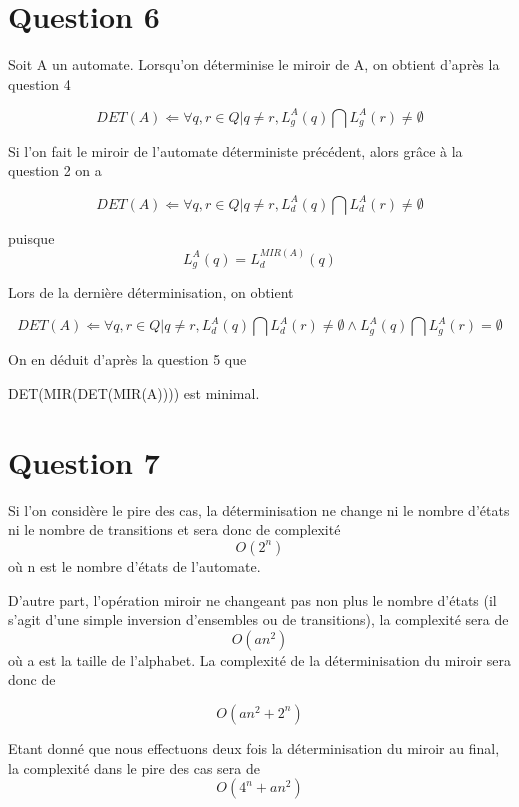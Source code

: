 \documentclass{article}
\begin{document}
\section{Question 6}

Soit A un automate. Lorsqu'on déterminise le miroir de A, on obtient d'après la question 4

\[ DET(A)  \Leftarrow \forall q, r \in Q | q \neq r,  L_g^A(q) \bigcap L_g^A(r) \neq \emptyset \]

Si l'on fait le miroir de l'automate déterministe précédent, alors grâce à la question 2 on a 

\[ DET(A) \Leftarrow \forall q, r \in Q | q \neq r,  L_d^A(q) \bigcap L_d^A(r) \neq \emptyset \]

puisque \[L_g^A(q) = L_d^{MIR(A)}(q)\]

Lors de la dernière déterminisation, on obtient 

\[DET(A) \Leftarrow \forall q, r \in Q | q \neq r,  L_d^A(q) \bigcap L_d^A(r) \neq \emptyset \wedge L_g^A(q) \bigcap  L_g^A(r) = \emptyset\]

On en déduit d'après la question 5 que 

DET(MIR(DET(MIR(A)))) est minimal.

\section{Question 7}

Si l'on considère le pire des cas, la déterminisation ne change ni le nombre d'états ni le nombre de transitions et sera donc de complexité 
\[O(2^n)\] où n est le nombre d'états de l'automate. 

D'autre part, l'opération miroir ne changeant pas non plus le nombre d'états (il s'agit d'une simple inversion d'ensembles ou de transitions), la complexité sera de
\[ O(an^2) \]
 où a est la taille de l'alphabet.
La complexité de la déterminisation du miroir sera donc de 

\[O(an^2 + 2^n)\]

Etant donné que nous effectuons deux fois la déterminisation du miroir au final, la complexité dans le pire des cas sera de 
\[O(4^n+ an^2)\]
\end{document}

